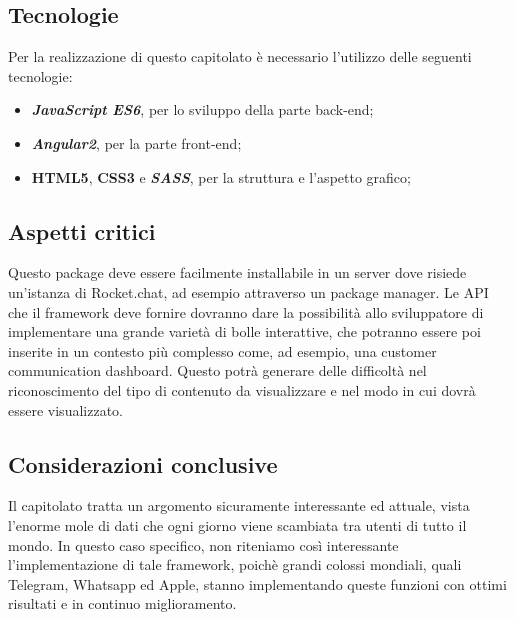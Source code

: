 \subsection{Tecnologie}

Per la realizzazione di questo capitolato è necessario l'utilizzo delle seguenti tecnologie:
\begin{itemize}
	\item \textbf{\textit{JavaScript ES6}}, per lo sviluppo della parte back-end;
	\item \textbf{\textit{Angular2}}, per la parte front-end;
	\item \textbf{HTML5}, \textbf{CSS3} e \textbf{\textit{SASS}}, per la struttura e l'aspetto grafico;
\end{itemize}

\subsection{Aspetti critici}

Questo package deve essere facilmente installabile in un server dove
risiede un'istanza di Rocket.chat, ad esempio attraverso un package
manager. Le API che il framework deve fornire dovranno dare la possibilità
allo sviluppatore di implementare una grande varietà di bolle interattive,
che potranno essere poi inserite in un contesto più complesso come, ad esempio, una customer communication dashboard. Questo potrà generare delle difficoltà
nel riconoscimento del tipo di contenuto da visualizzare e nel modo
in cui dovrà essere visualizzato. 

\subsection{Considerazioni conclusive}

Il capitolato tratta un argomento sicuramente interessante ed attuale,
vista l'enorme mole di dati che ogni giorno viene scambiata tra utenti
di tutto il mondo. In questo caso specifico, non riteniamo così interessante
l'implementazione di tale framework, poichè grandi colossi mondiali, quali Telegram, Whatsapp ed Apple, stanno implementando queste funzioni con ottimi risultati e in continuo miglioramento.
